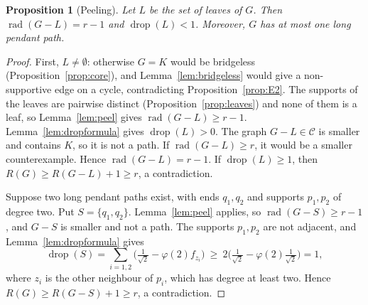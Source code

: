 \documentclass[11pt,a4paper]{article}
\newtheorem{proposition}[theorem]{Proposition}
\theoremstyle{definition}
\newcommand{\rad}{\operatorname{rad}}
\newcommand{\drop}{\operatorname{drop}}
\newcommand{\C}{\mathcal{C}}
\begin{document}
\begin{proposition}[Peeling]\label{prop:peeling}
Let $L$ be the set of leaves of $G$. Then $\rad(G-L)=r-1$ and $\drop(L)<1$. Moreover, $G$ has at most one long pendant path.
\end{proposition}
\begin{proof}
First, $L\ne\emptyset$: otherwise $G=K$ would be bridgeless (Proposition~\ref{prop:core}), and Lemma~\ref{lem:bridgeless} would give a non-supportive edge on a cycle, contradicting Proposition~\ref{prop:E2}. The supports of the leaves are pairwise distinct (Proposition~\ref{prop:leaves}) and none of them is a leaf, so Lemma~\ref{lem:peel} gives $\rad(G-L)\ge r-1$. Lemma~\ref{lem:dropformula} gives $\drop(L)>0$. The graph $G-L\in\C$ is smaller and contains $K$, so it is not a path. If $\rad(G-L)\ge r$, it would be a smaller counterexample. Hence $\rad(G-L)=r-1$. If $\drop(L)\ge1$, then $R(G)\ge R(G-L)+1\ge r$, a contradiction.

Suppose two long pendant paths exist, with ends $q_1,q_2$ and supports $p_1,p_2$ of degree two. Put $S=\{q_1,q_2\}$. Lemma~\ref{lem:peel} applies, so $\rad(G-S)\ge r-1$, and $G-S$ is smaller and not a path. The supports $p_1,p_2$ are not adjacent, and Lemma~\ref{lem:dropformula} gives
\[
\drop(S)=\sum_{i=1,2}\bigl(\tfrac1{\sqrt2}-\varphi(2)f_{z_i}\bigr)\ \ge\ 2\bigl(\tfrac1{\sqrt2}-\varphi(2)\tfrac1{\sqrt2}\bigr)=1,
\]
where $z_i$ is the other neighbour of $p_i$, which has degree at least two. Hence $R(G)\ge R(G-S)+1\ge r$, a contradiction.
\end{proof}
\end{document}

